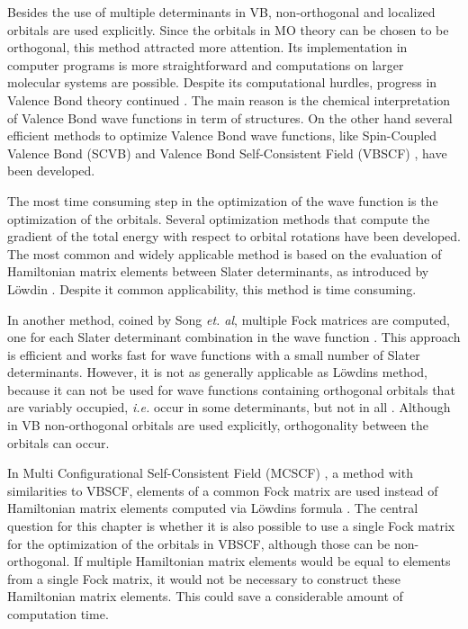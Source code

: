 Besides the use of multiple determinants in VB, non-orthogonal and localized orbitals are used explicitly. Since the orbitals in MO theory can be chosen to be orthogonal, this method attracted more attention. Its implementation in computer programs is more straightforward and computations on larger molecular systems are possible. Despite its computational hurdles, progress in Valence Bond theory continued \cite{vboverv1,vboverv2,vboverv3}. The main reason is the chemical interpretation of Valence Bond wave functions in term of structures. On the other hand several efficient methods to optimize Valence Bond wave functions, like Spin-Coupled Valence Bond (SCVB) \cite{scvb1,scvb2,scvb3} and Valence Bond Self-Consistent Field (VBSCF) \cite{vbscf1,vbscf2,koos1,zahid}, have been developed.

The most time consuming step in the optimization of the wave function is the optimization of the orbitals. Several optimization methods that compute the gradient of the total energy with respect to orbital rotations have been developed. The most common and widely applicable method is based on the evaluation of Hamiltonian matrix elements between Slater determinants, as introduced by L\"{o}wdin \cite{lowdin}. Despite it common applicability, this method is time consuming.

In another method, coined by Song \textit{et. al}, multiple Fock matrices are computed, one for each Slater determinant combination in the wave function \cite{song}. This approach is efficient and works fast for wave functions with a small number of Slater determinants. However, it is not as generally applicable as L\"{o}wdins method, because it can not be used for wave functions containing orthogonal orbitals that are variably occupied, \textit{i.e.} occur in some determinants, but not in all \cite{xmvb}. Although in VB non-orthogonal orbitals are used explicitly, orthogonality between the orbitals can occur.

In Multi Configurational Self-Consistent Field (MCSCF) \cite{joop,mcscf,roos1,roos2}, a method with similarities to VBSCF, elements of a common Fock matrix are used instead of Hamiltonian matrix elements computed via L\"{o}wdins formula \cite{roos1}. The central question for this chapter is whether it is also possible to use a single Fock matrix for the optimization of the orbitals in VBSCF, although those can be non-orthogonal. If multiple Hamiltonian matrix elements would be equal to elements from a single Fock matrix, it would not be necessary to construct these Hamiltonian matrix elements. This could save a considerable amount of computation time.

